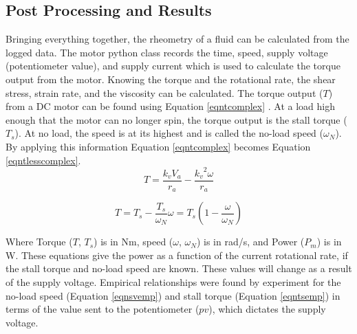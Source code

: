 \documentclass[twoside,a4]{report}
\begin{document}
	\subsection*{Post Processing and Results} %
	Bringing everything together, the rheometry of a fluid can be calculated from the logged data. The motor python class records the time, speed, supply voltage (potentiometer value), and supply current which is used to calculate the torque output from the motor. Knowing the torque and the rotational rate, the shear stress, strain rate, and the viscosity can be calculated. The torque output (\(T\)) from a DC motor can be found using Equation \ref{eqntcomplex} \cite[p.~111-112]{backdcmotor}. At a load high enough that the motor can no longer spin, the torque output is the stall torque (\(T_s\)). At no load, the speed is at its highest and is called the no-load speed (\(\omega_N\)). By applying this information Equation \ref{eqntcomplex} becomes Equation \ref{eqntlesscomplex}.
	\begin{equation}
		T = \frac{k_v V_a}{r_a} - \frac{{{k_v}^2} \omega}{r_a}
		\label{eqntcomplex}
	\end{equation}
	
	
	\begin{equation}
		T = T_s - \frac{T_s}{\omega_N} \omega = T_s \left(1 - \frac{\omega}{\omega_N}\right)
		\label{eqntlesscomplex}
	\end{equation}
	
	
	\noindent
	Where Torque (\(T\), \(T_s\)) is in Nm, speed (\(\omega\), \(\omega_N\)) is in rad/s, and Power (\(P_m\)) is in W. These equations give the power as a function of the current rotational rate, if the stall torque and no-load speed are known. These values will change as a result of the supply voltage. Empirical relationships were found by experiment for the no-load speed (Equation \ref{eqnsvemp}) and stall torque (Equation \ref{eqntsemp}) in terms of the value sent to the potentiometer (\(pv\)), which dictates the supply voltage.
	
\end{document}
